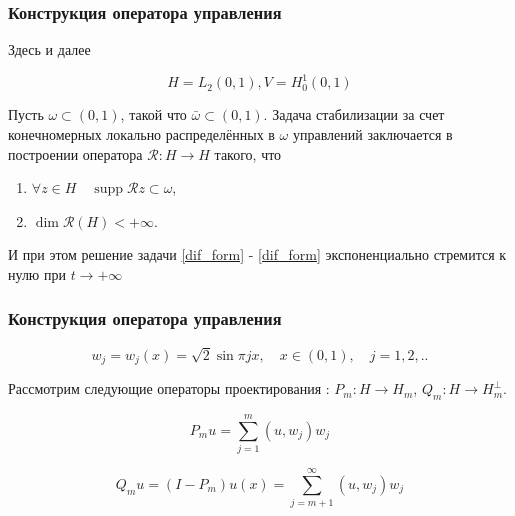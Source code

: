 \documentclass{beamer}
\newcommand{\operator}[1]{\mathcal{R}{#1}}
\newcommand{\supp}{\mathop{\mathrm{supp}}}
\begin{document}
\begin{frame}
\frametitle{Конструкция оператора управления}
Здесь и далее 
\begin{block}{}
\begin{equation}
	H = L_2(0, 1), V = H^1_0(0, 1)
\end{equation}
\end{block}

\hspace{5mm}Пусть $\omega \subset (0, 1)$, такой что $\bar{\omega} \subset (0, 1)$. Задача стабилизации за счет конечномерных локально распределённых в $\omega$ управлений заключается в построении оператора $\mathcal{R} : H \rightarrow H$ такого, что
\begin{enumerate}
\item $\forall z \in H \quad \supp \operator{z} \subset \omega$,
\item $\dim \operator{(H)} < +\infty$.
\end{enumerate}
И при этом решение задачи \eqref{dif_form} - \eqref{dif_form} экспоненциально стремится к нулю при $t \rightarrow + \infty$
\end{frame}


\begin{frame}
\frametitle{Конструкция оператора управления}

\begin{block}{}
\begin{equation}\label{basis}
	w_j = w_j(x) = \sqrt{2}\sin{\pi j x}, \quad x \in (0, 1), \quad j=1, 2,..
\end{equation}
\end{block}

Рассмотрим следующие операторы проектирования : $P_m : H \rightarrow H_m$, $Q_m : H \rightarrow H_m^{\perp}$.

\begin{block}{}
\begin{equation}
	P_m u = \sum \limits_{j=1}^{m} {(u, w_j) w_j}
\end{equation}

\begin{equation}
	Q_m u = (I - P_m)u(x) = \sum \limits_{j=m + 1}^{\infty} {(u, w_j) w_j}
\end{equation}
\end{block}

\end{frame}
\end{document}
